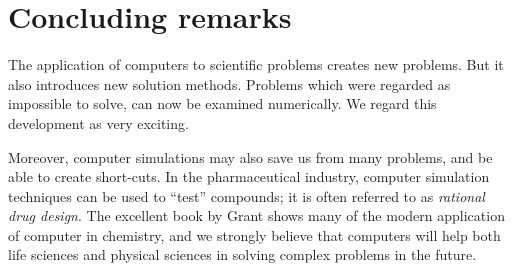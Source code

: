 \section{Concluding remarks}
\label{sect:MetaConclusion}
The application of computers to scientific problems creates new
problems. But it also introduces new solution methods. Problems which
were regarded as impossible to solve, can now be examined numerically.
We regard this development as very exciting.

Moreover, computer simulations may also save us from many problems, and
be able to create short-cuts. In the pharmaceutical industry, computer
simulation techniques can be used to ``test'' compounds; it is often
referred to as \textit{rational drug design}. The excellent book by
Grant \etal \cite{Grant95} shows many of the modern application of
computer in chemistry, and we strongly believe that computers will help
both life sciences and physical sciences in solving complex problems
in the future.
